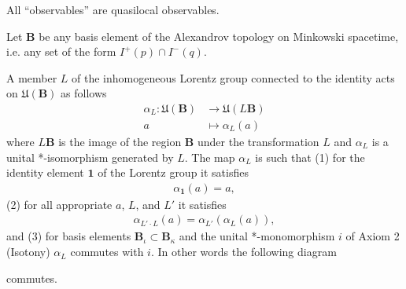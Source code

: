 \begin{definition}
    \label{def:quasilocal-completeness}
    \leanok
    All ``observables'' are quasilocal observables.
\end{definition}

\begin{definition}
    \label{def:lorentz-covariance}
    \leanok
    Let $\mathbf{B}$ be any basis element of the Alexandrov topology on Minkowski spacetime, i.e. any set of the form $I^+(p) \cap I^-(q)$.

    A member $L$ of the inhomogeneous Lorentz group connected to the identity acts on $\mathfrak{U}(\mathbf{B})$ as follows
    \begin{align}
        \alpha_L : \mathfrak{U}(\mathbf{B}) &\longrightarrow \mathfrak{U}(L\mathbf{B}) \\
                             a              &\longmapsto     \alpha_L(a)
    \end{align}
    where $L\mathbf{B}$ is the image of the region $\mathbf{B}$ under the transformation $L$ and $\alpha_L$ is a unital *-isomorphism generated by $L$. The map $\alpha_L$ is such that (1) for the identity element $\mathbf{1}$ of the Lorentz group it satisfies
    \begin{align}
        \alpha_{\mathbf{1}}(a) = a,
    \end{align}
    (2) for all appropriate $a$, $L$, and $L'$ it satisfies
    \begin{align}
        \alpha_{L' \cdot L}(a) = \alpha_{L'}(\alpha_{L}(a)),
    \end{align}
    and (3) for basis elements $\mathbf{B}_\iota \subset \mathbf{B}_\kappa$ and the unital *-monomorphism $i$ of Axiom 2 (Isotony) $\alpha_L$ commutes with $i$. In other words the following diagram

    \begin{center}
    \end{center}

    commutes.
\end{definition}

